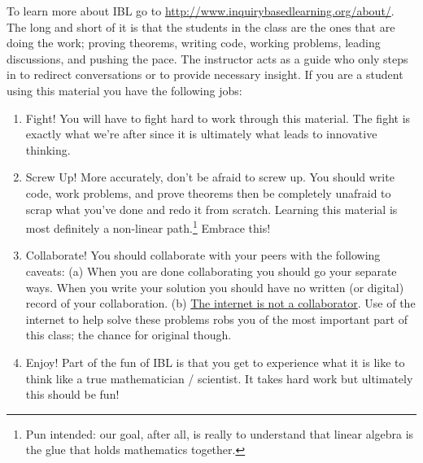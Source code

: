 To learn more about IBL go to
\href{http://www.inquirybasedlearning.org/about/}{http://www.inquirybasedlearning.org/about/}.
The long and short of it is that the students in the class are the ones that are doing the
work; proving theorems, writing code, working problems, leading discussions, and pushing the pace. The
instructor acts as a guide who only steps in to redirect conversations or to provide
necessary insight. If you are a student using this material you have the following jobs:
\begin{enumerate}
\item Fight!  You will have to fight hard to work through this material.  The fight is
        exactly what we're after since it is ultimately what leads to innovative thinking.
\item Screw Up!  More accurately, don't be afraid to screw up.  You should write code,
    work problems, and prove theorems then be completely unafraid to scrap what you've
    done and redo it from scratch.  Learning this material is most definitely a non-linear
    path.\footnote{Pun intended: our goal, after all, is really to understand that linear
        algebra is the glue that holds mathematics together.}
        Embrace this!
\item Collaborate!  You should collaborate with your peers with the following caveats:
        (a) When you are done collaborating you should go your separate ways.  When you
        write your solution you should have no written (or digital) record of your
        collaboration.  (b) \underline{The internet is not a collaborator}.  Use of the internet to
        help solve these problems robs you of the most important part of this class; the
        chance for original though.
\item Enjoy!  Part of the fun of IBL is that you get to experience what it is like to
        think like a true mathematician / scientist.  It takes hard work but ultimately
        this should be fun!
\end{enumerate}


